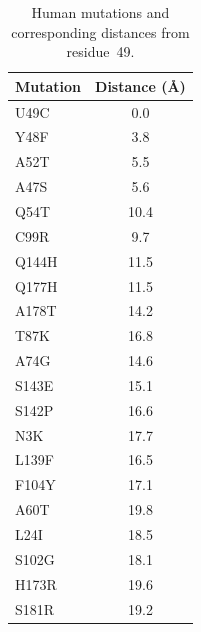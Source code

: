 \documentclass[journal=jpcbfk,manuscript=suppinfo]{achemso}
\begin{document}
\begin{table}[htbp]
\centering
\caption[Human pathway mutation distances]{Human mutations and corresponding distances from residue~49.}
\label{tab:human_mutation_distance}
\begin{tabular}{lc}
\toprule
\textbf{Mutation} & \textbf{Distance (\AA)} \\
\midrule
U49C & 0.0 \\
Y48F & 3.8 \\
A52T & 5.5 \\
A47S & 5.6 \\
Q54T & 10.4 \\
C99R & 9.7 \\
Q144H & 11.5 \\
Q177H & 11.5 \\
A178T & 14.2 \\
T87K & 16.8 \\
A74G & 14.6 \\
S143E & 15.1 \\
S142P & 16.6 \\
N3K & 17.7 \\
L139F & 16.5 \\
F104Y & 17.1 \\
A60T & 19.8 \\
L24I & 18.5 \\
S102G & 18.1 \\
H173R & 19.6 \\
S181R & 19.2 \\
\bottomrule
\end{tabular}
\end{table}
\end{document}
